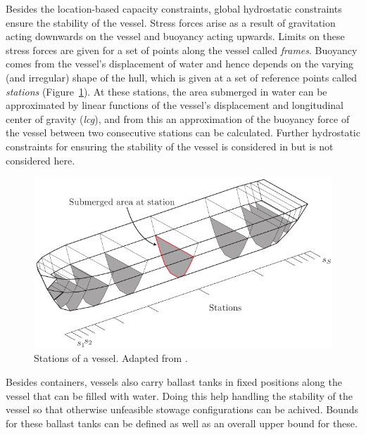 Besides the location-based capacity constraints, global hydrostatic constraints ensure the stability of the vessel. 
Stress forces arise as a result of gravitation acting downwards on the vessel and buoyancy acting upwards. Limits on these stress forces are given for a set of points along the vessel called \emph{frames}. %
Buoyancy comes from the vessel's displacement of water and hence depends on the varying (and irregular) shape of the hull, which is given at a set of reference points called \emph{stations} (Figure~\ref{fig:stations}). At these stations, the area submerged in water can be approximated by linear functions of the vessel's displacement and longitudinal center of gravity (\emph{lcg}), and from this an approximation of the buoyancy force of the vessel between two consecutive stations can be calculated. 
Further hydrostatic constraints for ensuring the stability of the vessel is considered in \cite{AlbertosThesis} but is not considered here.
%
\begin{figure}[htbp]
  \centering
   \includegraphics[scale=0.7]{figures/stations.pdf}
\caption{Stations of a vessel. Adapted from \cite{AlbertosThesis}.}
\label{fig:stations}
\end{figure}

Besides containers, vessels also carry ballast tanks in fixed positions along the vessel that can be filled with water. Doing this help handling the stability of the vessel so that otherwise unfeasible stowage configurations can be {achived}. {Bounds for these ballast tanks can be defined as well as an overall upper bound for these.}

